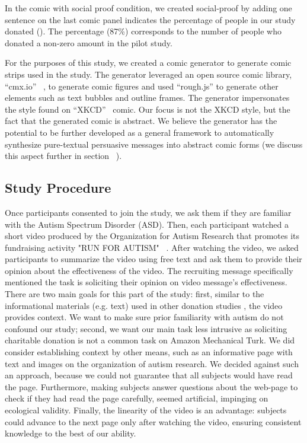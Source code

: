 In the comic with social proof condition, we created social-proof by adding one sentence on the last comic panel indicates the percentage of people in our study donated (). The percentage (87\%) corresponds to the number of people who donated a non-zero amount in the pilot study.

For the purposes of this study, we created a comic generator to generate comic strips used in the study. The generator leveraged an open source comic library, ``cmx.io'' ~\cite{cmx.io}, to generate comic figures and used ``rough.js'' \cite{rough.js} to generate other elements such as text bubbles and outline frames. The generator impersonates the style found on ``XKCD''~\cite{munroe2009xkcd} comic. Our focus is not the XKCD style, but the fact that the generated comic is abstract. We believe the generator has the potential to be further developed as a general framework to automatically synthesize pure-textual persuasive messages into abstract comic forms (we discuss this aspect further in section ~).


\subsection{Study Procedure} 
\label{sub:Study Procedure}
Once participants consented to join the study, we ask them if they are familiar with the Autism Spectrum Disorder (ASD). Then, each participant watched a short video produced by the Organization for Autism Research that promotes its fundraising activity "RUN FOR AUTISM" ~\cite{youtube_research}. After watching the video, we asked participants to summarize the video using free text and ask them to provide their opinion about the effectiveness of the video. The recruiting message specifically mentioned the task is soliciting their opinion on video message's effectiveness. There are two main goals for this part of the study: first, similar to the informational materials (e.g. text) used in other donation studies \cite{lee2013does,10362981,feiler2012mixed}, the video provides context. We want to make sure prior familiarity with autism do not confound our study; second, we want our main task less intrusive as soliciting charitable donation is not a common task on Amazon Mechanical Turk. We did consider establishing context by other means, such as an informative page with text and images on the organization of autism research. We decided against such an approach, because we could not guarantee that all subjects would have read the page. Furthermore, making subjects answer questions about the web-page to check if they had read the page carefully, seemed artificial, impinging on ecological validity. Finally, the linearity of the video is an advantage: subjects could advance to the next page only after watching the video, ensuring consistent knowledge to the best of our ability.

